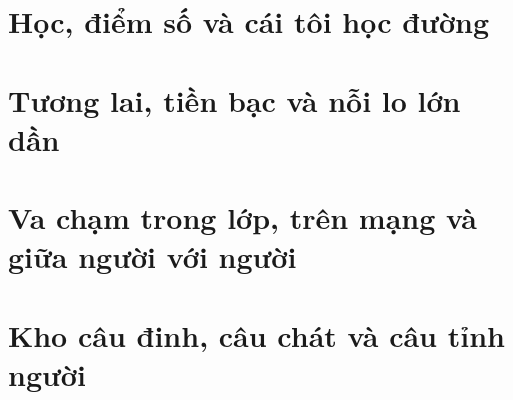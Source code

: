 \documentclass[14pt,a4paper,twoside]{extbook}
\begin{document}
\frontmatter



\tableofcontents
\clearpage

\mainmatter
\part{Học, điểm số và cái tôi học đường}






\part{Tương lai, tiền bạc và nỗi lo lớn dần}



\part{Va chạm trong lớp, trên mạng và giữa người với người}







\part{Kho câu đinh, câu chát và câu tỉnh người}




\backmatter

\end{document}
